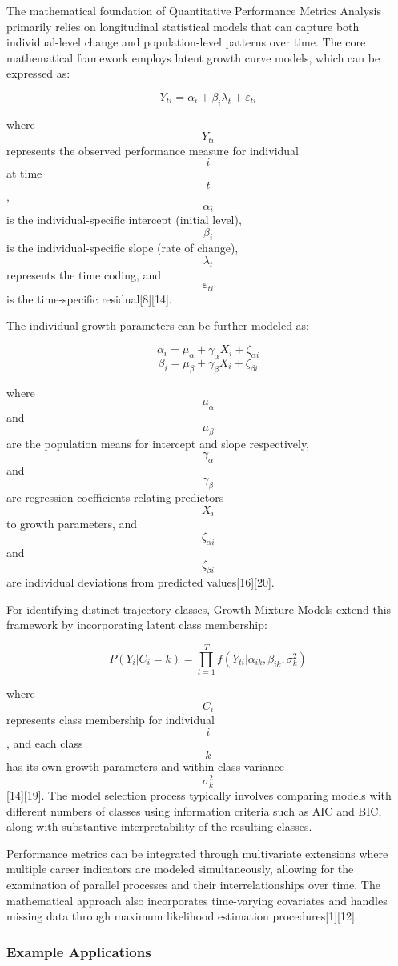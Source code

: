 \documentclass[main.tex]{subfiles}
\begin{document}
The mathematical foundation of Quantitative Performance Metrics Analysis primarily relies on longitudinal statistical models that can capture both individual-level change and population-level patterns over time. The core mathematical framework employs latent growth curve models, which can be expressed as:

$$Y_{ti} = \alpha_i + \beta_i \lambda_t + \varepsilon_{ti}$$

where $$Y_{ti}$$ represents the observed performance measure for individual $$i$$ at time $$t$$, $$\alpha_i$$ is the individual-specific intercept (initial level), $$\beta_i$$ is the individual-specific slope (rate of change), $$\lambda_t$$ represents the time coding, and $$\varepsilon_{ti}$$ is the time-specific residual[8][14].

The individual growth parameters can be further modeled as:

$$\alpha_i = \mu_\alpha + \gamma_\alpha X_i + \zeta_{\alpha i}$$
$$\beta_i = \mu_\beta + \gamma_\beta X_i + \zeta_{\beta i}$$

where $$\mu_\alpha$$ and $$\mu_\beta$$ are the population means for intercept and slope respectively, $$\gamma_\alpha$$ and $$\gamma_\beta$$ are regression coefficients relating predictors $$X_i$$ to growth parameters, and $$\zeta_{\alpha i}$$ and $$\zeta_{\beta i}$$ are individual deviations from predicted values[16][20].

For identifying distinct trajectory classes, Growth Mixture Models extend this framework by incorporating latent class membership:

$$P(Y_i | C_i = k) = \prod_{t=1}^T f(Y_{ti} | \alpha_{ik}, \beta_{ik}, \sigma^2_{k})$$

where $$C_i$$ represents class membership for individual $$i$$, and each class $$k$$ has its own growth parameters and within-class variance $$\sigma^2_{k}$$[14][19]. The model selection process typically involves comparing models with different numbers of classes using information criteria such as AIC and BIC, along with substantive interpretability of the resulting classes.

Performance metrics can be integrated through multivariate extensions where multiple career indicators are modeled simultaneously, allowing for the examination of parallel processes and their interrelationships over time. The mathematical approach also incorporates time-varying covariates and handles missing data through maximum likelihood estimation procedures[1][12].

\subsubsection{Example Applications}
\end{document}

